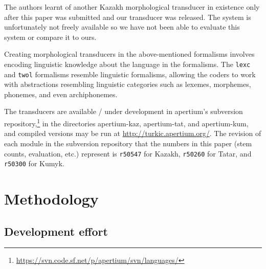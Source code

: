 \documentclass[a4paper,11pt,twocolumn]{article}
\begin{document}
The authors learnt of another Kazakh morphological transducer in existence \citep{bekmanova2013} only after this paper was submitted and our transducer was released.  The system is unfortunately not freely available so we have not been able to evaluate this system or compare it to ours.

Creating morphological transducers in the above-mentioned formalisms involves encoding linguistic knowledge about the language in the formalisms.  The \texttt{lexc} and \texttt{twol} formalisms resemble linguistic formalisms, allowing the coders to work with abstractions resembling linguistic categories such as lexemes, morphemes, phonemes, and even archiphonemes.


The transducers are available / under development in apertium's subversion repository,\footnote{{\scriptsize \url{https://svn.code.sf.net/p/apertium/svn/languages/}}} in the directories apertium-kaz, apertium-tat, and apertium-kum, and compiled versions may be run at \url{http://turkic.apertium.org/}.  The revision of each module in the subversion repository that the numbers in this paper (stem counts, evaluation, etc.) represent is \texttt{r50547} for Kazakh, \texttt{r50260} for Tatar, and \texttt{r50300} for Kumyk.


\section{Methodology}\label{sec:methodology}





\subsection{Development effort}

\end{document}
